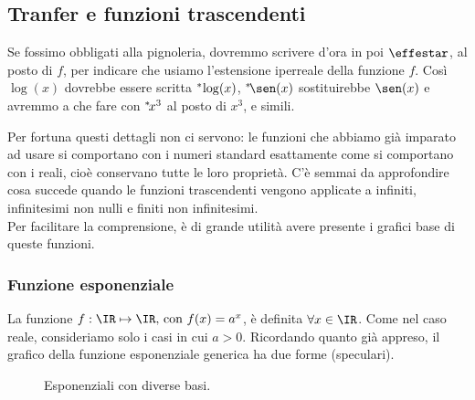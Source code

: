 \subsection{Tranfer e funzioni trascendenti}
\label{subsec:insnum_ftrascendenti}
Se fossimo obbligati alla pignoleria, dovremmo scrivere d'ora in poi 
$\effestar$, al posto di $f$, per indicare che usiamo l'estensione iperreale della 
funzione $f$. 
Così $\log(x)$ dovrebbe essere scritta ${}^*\hspace{-.15em}\log(x)$, 
${}^*\hspace{-.15em}\sen(x)$ sostituirebbe $\sen(x)$ e avremmo a che
fare con ${}^*\hspace{-.15em}x^3$ al posto di $x^3$, e simili.

Per fortuna questi dettagli non ci servono: le funzioni che abbiamo già 
imparato ad usare si comportano con i numeri standard esattamente come si 
comportano con i reali, cioè conservano tutte le loro proprietà.
C'è semmai da approfondire cosa succede quando le funzioni trascendenti 
vengono applicate a infiniti, infinitesimi non nulli e finiti non infinitesimi.\\
Per facilitare la comprensione, è di grande utilità avere presente i grafici 
base di queste funzioni.

\subsubsection{Funzione esponenziale}
\label{subsubsec:insnum_expstar}
La funzione $f:\IR\mapsto \IR \text{, con } f(x)= a^x$, è definita $\forall x \in \IR$.
Come nel caso reale, consideriamo solo i casi in cui $a>0$.  Ricordando quanto già appreso, 
il grafico della funzione esponenziale generica ha due forme (speculari). \\

\begin{figure}[h]
\begin{inaccessibleblock}
 \begin{center}
\espdueterzi
 \end{center}
\end{inaccessibleblock}
\caption{Esponenziali con diverse basi.} \label{fig:diversebasi}
\end{figure}
 
